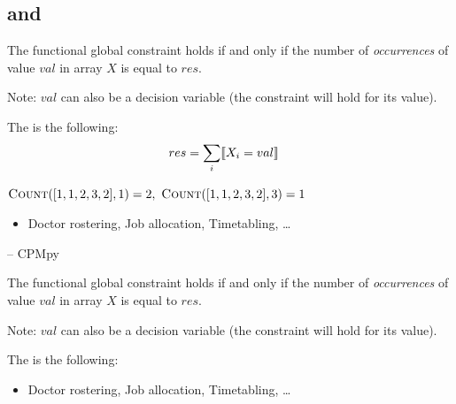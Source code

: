 \documentclass{cons-beamer}
\begin{document}
\subsection{ and }


\begin{frame}{}
	\begin{definition}
		The  functional global constraint holds if and only if the number of \textit{occurrences} of value $val$ in array $X$ is equal to $res$.
	\end{definition}
	\vfill
	
	Note: $val$ can also be a decision variable (the constraint will hold for its value).
	\vfill
	
	The  is the following:
	\begin{align*}
		&res = \sum_{i} \llbracket X_i = val \rrbracket &
	\end{align*}
	
	\begin{examples}
	  $\textsc{Count}([1,1,2,3,2], 1) = 2, ~ \textsc{Count}([1,1,2,3,2], 3) = 1$
	  \begin{itemize}
	    \item Doctor rostering, Job allocation, Timetabling, \dots
	  \end{itemize}
	\end{examples}
\end{frame}


\begin{flashcardcpmpy}
\begin{frame}{ -- CPMpy}
	\begin{definition}
		The  functional global constraint holds if and only if the number of \textit{occurrences} of value $val$ in array $X$ is equal to $res$.
	\end{definition}
	\vfill
	
	Note: $val$ can also be a decision variable (the constraint will hold for its value).
	\vfill
	
	The  is the following:
	\begin{center}
	  \cpminline{res == cp.sum(X == val)}
	\end{center}
	\vfill
	
	\begin{examples}
		\begin{itemize}
			\item Doctor rostering, Job allocation, Timetabling, \dots
		\end{itemize}
	\end{examples}
\end{frame}
\end{flashcardcpmpy}
\end{document}
